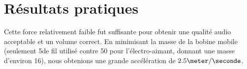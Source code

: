 \section{Résultats pratiques}
Cette force relativement faible fut suffisante pour obtenir une qualité audio acceptable et un volume correct. 
En minimisant la masse de la bobine mobile (seulement 5\meter de fil utilisé contre 50 pour l'électro-aimant, 
donnant une masse d'environ 16\gramme), nous obtenions une grande accélération de $2.5\meter / \seconde$. 